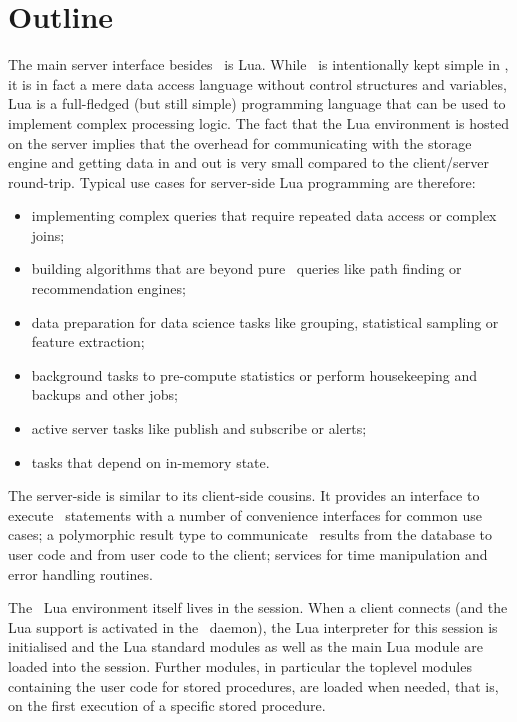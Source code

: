 \section{Outline}
The main server interface
besides \sql\ is Lua.
While \sql\ is intentionally kept simple in \nowdb,
it is in fact a mere data access language
without control structures and variables,
Lua is a full-fledged (but still simple)
programming language that can be used to
implement complex processing logic.
The fact that the Lua environment is hosted
on the server implies that the overhead
for communicating with the storage engine
and getting data in and out is very small
compared to the client/server round-trip.
Typical use cases for server-side Lua programming
are therefore:

\begin{itemize}
\item implementing complex queries that require
      repeated data access or complex joins;
\item building algorithms that are beyond pure \sql\ queries
      like path finding or recommendation engines; 
\item data preparation for data science tasks
      like grouping, statistical sampling or
       feature extraction; 
\item background tasks to pre-compute statistics or
      perform housekeeping and backups
      and other  jobs;
\item active server tasks like publish and subscribe or alerts;
\item tasks that depend on in-memory state.
\end{itemize}

The server-side  is similar
to its client-side cousins. It provides
an interface to execute \sql\ statements with
a number of convenience interfaces for common
use cases; a polymorphic result type
to communicate \sql\ results from the database
to user code and
from user code to the client; services for
time manipulation and error handling routines.

The \nowdb\ Lua environment itself
lives in the session.
When a client connects
(and the Lua support
is activated in the \nowdb\ daemon),
the Lua interpreter for this session is initialised
and the Lua standard modules 
as well as the main Lua module are loaded
into the session.
Further modules, in particular the toplevel modules
containing the user code for stored procedures,
are loaded when needed, that is, on the first
execution of a specific stored procedure.

